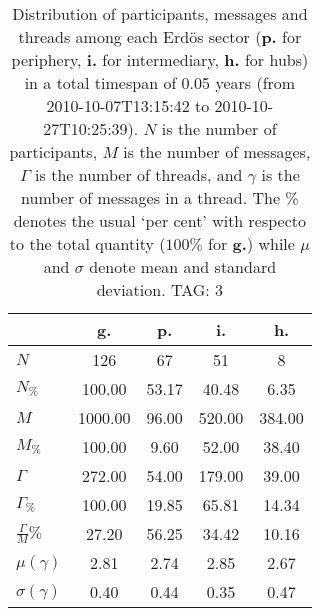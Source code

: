\begin{table}[h!]
\begin{center}
\begin{tabular}{| l || c | c | c | c |}\hline
 & {\bf g.} & {\bf p.} & {\bf i.} & {\bf h.} \\\hline\hline
$N$ & 126  & 67  & 51  & 8 \\
$N_{\%}$ & 100.00  & 53.17  & 40.48  & 6.35 \\\hline
$M$ & 1000.00  & 96.00  & 520.00  & 384.00 \\
$M_{\%}$ & 100.00  & 9.60  & 52.00  & 38.40 \\\hline
$\Gamma$ & 272.00  & 54.00  & 179.00  & 39.00 \\
$\Gamma_{\%}$ & 100.00  & 19.85  & 65.81  & 14.34 \\\hline
$\frac{\Gamma}{M}\%$ & 27.20  & 56.25  & 34.42  & 10.16 \\
$\mu(\gamma)$ & 2.81  & 2.74  & 2.85  & 2.67 \\
$\sigma(\gamma)$ & 0.40  & 0.44  & 0.35  & 0.47 \\\hline
\end{tabular}
\caption{Distribution of participants, messages and threads among each Erd\"os sector ({\bf p.} for periphery, {\bf i.} for intermediary, 
    {\bf h.} for hubs) in a total timespan of 0.05 years (from 2010-10-07T13:15:42 to 2010-10-27T10:25:39). $N$ is the number of participants, $M$ is the number of messages, $\Gamma$ is the number of threads, and $\gamma$ is the number of messages in a thread.
    The \% denotes the usual `per cent' with respecto to the total quantity ($100\%$ for {\bf g.})
    while $\mu$ and $\sigma$ denote mean and standard deviation. TAG: 3}
\end{center}
\end{table}